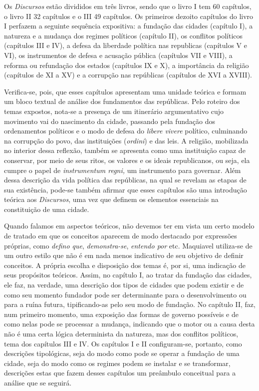 Os \emph{Discursos} estão divididos em três livros, sendo que o livro I
tem 60 capítulos, o livro II 32 capítulos e o III 49 capítulos. Os
primeiros dezoito capítulos do livro I perfazem a seguinte sequência
expositiva: a fundação das cidades (capítulo I), a natureza e a mudança
dos regimes políticos (capítulo II), os conflitos políticos (capítulos
III e IV), a defesa da liberdade política nas republicas (capítulos V e
VI), os instrumentos de defesa e acusação pública (capítulos VII e
VIII), a reforma ou refundação dos estados (capítulos IX e X), a
importância da religião (capítulos de XI a XV) e a corrupção nas
repúblicas (capítulos de XVI a XVIII).

Verifica-se, pois, que esses capítulos apresentam uma unidade teórica e
formam um bloco textual de análise dos fundamentos das repúblicas. Pelo
roteiro dos temas expostos, nota-se a presença de um itinerário
argumentativo cujo movimento vai do nascimento da cidade, passando pela
fundação dos ordenamentos políticos e o modo de defesa do \emph{libere
vivere} político, culminando na corrupção do povo, das instituições
(\emph{ordini}) e das leis. A religião, mobilizada no interior dessa
reflexão, também se apresenta como uma instituição capaz de conservar,
por meio de seus ritos, os valores e os ideais republicanos, ou seja,
ela cumpre o papel de \emph{instrumentum regni,} um instrumento para
governar. Além dessa descrição da vida política das repúblicas, na qual
se revelam as etapas de sua existência, pode-se também afirmar que esses
capítulos são uma introdução teórica aos \emph{Discursos}, uma vez que
definem os elementos essenciais na constituição de uma cidade.

Quando falamos em aspectos teóricos, não devemos ter em vista um certo
modelo de tratado em que os conceitos aparecem de modo destacado por
expressões próprias, como \emph{defino que}, \emph{demonstra-se},
\emph{entendo por} etc. Maquiavel utiliza-se de um outro estilo que não
é em nada menos indicativo de seu objetivo de definir conceitos. A
própria escolha e disposição dos temas é, por si, uma indicação de seus
propósitos teóricos. Assim, no capítulo I, ao tratar da fundação das
cidades, ele faz, na verdade, uma descrição dos tipos de cidades que
podem existir e de como seu momento fundador pode ser determinante para
o desenvolvimento ou para a ruína futura, tipificando-as pelo seu modo
de fundação. No capítulo II, faz, num primeiro momento, uma exposição
das formas de governo possíveis e de como nelas pode se processar a
mudança, indicando que o motor ou a causa desta não é uma certa lógica
determinista da natureza, mas dos conflitos políticos, tema dos
capítulos III e IV. Os capítulos I e II configuram-se, portanto, como
descrições tipológicas, seja do modo como pode se operar a fundação de
uma cidade, seja do modo como os regimes podem se instalar e se
transformar, descrições estas que fazem desses capítulos um preâmbulo
conceitual para a análise que se seguirá.

